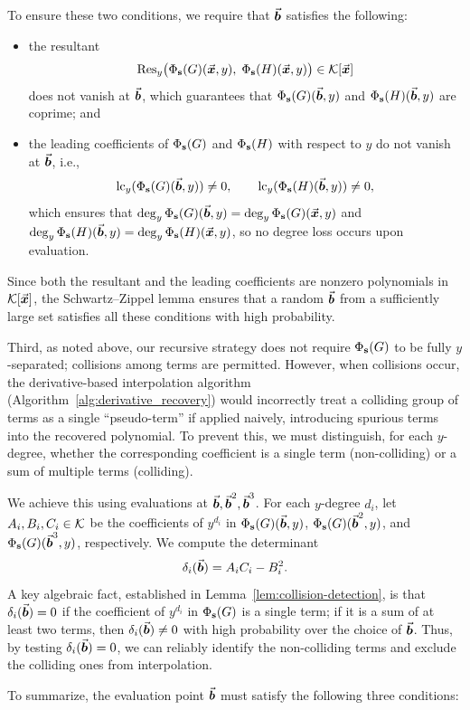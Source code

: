 \documentclass{article}
\numberwithin{equation}{section}
\begin{document}
To ensure these two conditions, we require that $\vec{\boldsymbol{b}}$ satisfies the following:
\begin{itemize}
    \item the resultant
    \[
    \operatorname{Res}_y\bigl( \Phi_{\mathbf{s}}(G)(\vec{\boldsymbol{x}}, y),\; \Phi_{\mathbf{s}}(H)(\vec{\boldsymbol{x}}, y) \bigr) \in {\mathcal{K}}[\vec{\boldsymbol{x}}]
    \]
    does not vanish at $\vec{\boldsymbol{b}}$, which guarantees that $\Phi_{\mathbf{s}}(G)(\vec{\boldsymbol{b}}, y)$ and $\Phi_{\mathbf{s}}(H)(\vec{\boldsymbol{b}}, y)$ are coprime; and
    \item the leading coefficients of $\Phi_{\mathbf{s}}(G)$ and $\Phi_{\mathbf{s}}(H)$ with respect to $y$ do not vanish at $\vec{\boldsymbol{b}}$, i.e.,
    \[
    \operatorname{lc}_y(\Phi_{\mathbf{s}}(G)(\vec{\boldsymbol{b}}, y)) \neq 0, \qquad \operatorname{lc}_y(\Phi_{\mathbf{s}}(H)(\vec{\boldsymbol{b}}, y)) \neq 0,
    \]
    which ensures that $\deg_y \Phi_{\mathbf{s}}(G)(\vec{\boldsymbol{b}}, y) = \deg_y \Phi_{\mathbf{s}}(G)(\vec{\boldsymbol{x}}, y)$ and $\deg_y \Phi_{\mathbf{s}}(H)(\vec{\boldsymbol{b}}, y) = \deg_y \Phi_{\mathbf{s}}(H)(\vec{\boldsymbol{x}}, y)$, so no degree loss occurs upon evaluation.
\end{itemize}
Since both the resultant and the leading coefficients are nonzero polynomials in ${\mathcal{K}}[\vec{\boldsymbol{x}}]$, the Schwartz--Zippel lemma ensures that a random $\vec{\boldsymbol{b}}$ from a sufficiently large set satisfies all these conditions with high probability.

Third, as noted above, our recursive strategy does not require $\Phi_{\mathbf{s}}(G)$ to be fully $y$-separated; collisions among terms are permitted. However, when collisions occur, the derivative-based interpolation algorithm (Algorithm~\ref{alg:derivative_recovery}) would incorrectly treat a colliding group of terms as a single ``pseudo-term'' if applied naively, introducing spurious terms into the recovered polynomial. To prevent this, we must distinguish, for each $y$-degree, whether the corresponding coefficient is a single term (non-colliding) or a sum of multiple terms (colliding). 

We achieve this using evaluations at $\vec{\boldsymbol{b}}, \vec{\boldsymbol{b}}^2, \vec{\boldsymbol{b}}^3$. For each $y$-degree $d_i$, let $A_i, B_i, C_i \in {\mathcal{K}}$ be the coefficients of $y^{d_i}$ in $\Phi_{\mathbf{s}}(G)(\vec{\boldsymbol{b}}, y)$, $\Phi_{\mathbf{s}}(G)(\vec{\boldsymbol{b}}^2, y)$, and $\Phi_{\mathbf{s}}(G)(\vec{\boldsymbol{b}}^3, y)$, respectively. We compute the determinant
\[
\delta_i(\vec{\boldsymbol{b}}) = A_i C_i - B_i^2.
\]
A key algebraic fact, established in Lemma~\ref{lem:collision-detection}, is that $\delta_i(\vec{\boldsymbol{b}}) = 0$ if the coefficient of $y^{d_i}$ in $\Phi_{\mathbf{s}}(G)$ is a single term; if it is a sum of at least two terms, then $\delta_i(\vec{\boldsymbol{b}}) \neq 0$ with high probability over the choice of $\vec{\boldsymbol{b}}$. Thus, by testing $\delta_i(\vec{\boldsymbol{b}}) = 0$, we can reliably identify the non-colliding terms and exclude the colliding ones from interpolation.

To summarize, the evaluation point $\vec{\boldsymbol{b}}$ must satisfy the following three conditions:
\end{document}

